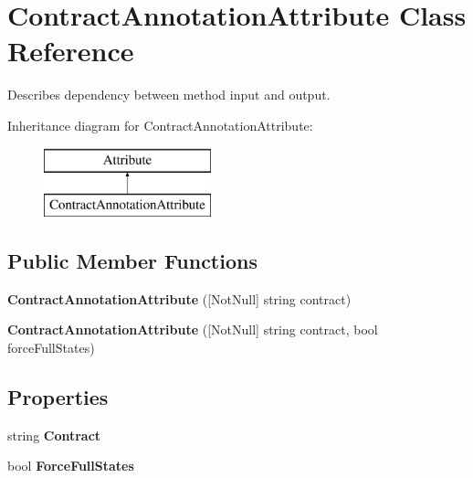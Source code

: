 \hypertarget{class_contract_annotation_attribute}{}\section{Contract\+Annotation\+Attribute Class Reference}
\label{class_contract_annotation_attribute}


Describes dependency between method input and output.  


Inheritance diagram for Contract\+Annotation\+Attribute\+:\begin{figure}[H]
\begin{center}
\leavevmode
\includegraphics[height=2.000000cm]{class_contract_annotation_attribute}
\end{center}
\end{figure}
\subsection*{Public Member Functions}
\begin{DoxyCompactItemize}
\item 
\hypertarget{class_contract_annotation_attribute_a635552c48df4e94f26deb7598f7a5028}{}{\bfseries Contract\+Annotation\+Attribute} (\mbox{[}Not\+Null\mbox{]} string contract)\label{class_contract_annotation_attribute_a635552c48df4e94f26deb7598f7a5028}

\item 
\hypertarget{class_contract_annotation_attribute_a886eedce3d8c7a269549a3293a2bfd99}{}{\bfseries Contract\+Annotation\+Attribute} (\mbox{[}Not\+Null\mbox{]} string contract, bool force\+Full\+States)\label{class_contract_annotation_attribute_a886eedce3d8c7a269549a3293a2bfd99}

\end{DoxyCompactItemize}
\subsection*{Properties}
\begin{DoxyCompactItemize}
\item 
\hypertarget{class_contract_annotation_attribute_a19445968a4365371890d047311eaa1c4}{}string {\bfseries Contract}\label{class_contract_annotation_attribute_a19445968a4365371890d047311eaa1c4}

\item 
\hypertarget{class_contract_annotation_attribute_a329c6f99fe2ed0c08df3898586cbf965}{}bool {\bfseries Force\+Full\+States}\label{class_contract_annotation_attribute_a329c6f99fe2ed0c08df3898586cbf965}

\end{DoxyCompactItemize}


